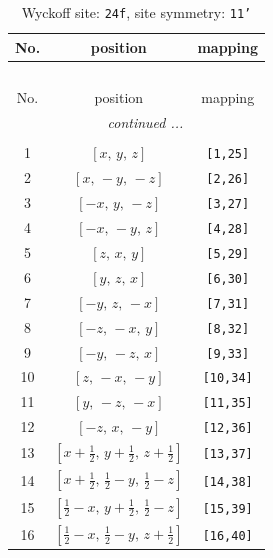 \documentclass[fleqn,8pt]{jsarticle}
\begin{document}
\begin{longtable}{ccc}
\caption{Wyckoff site: {\tt 24f}, site symmetry: {\tt 11'}}
 \\
 \hline \hline
No. & position & mapping \\ \hline \endfirsthead

\multicolumn{2}{l}{\tablename\ \thetable{}} \\
 \hline \hline
No. & position & mapping \\ \hline \endhead

 \hline \hline
\multicolumn{2}{r}{\footnotesize\it continued ...} \\ \endfoot

 \hline \hline
\multicolumn{2}{r}{} \\ \endlastfoot

1 & $\left[ x,\, y,\, z \right]$ & {\tt [1,25]} \\ \hline
2 & $\left[ x,\, - y,\, - z \right]$ & {\tt [2,26]} \\ \hline
3 & $\left[ - x,\, y,\, - z \right]$ & {\tt [3,27]} \\ \hline
4 & $\left[ - x,\, - y,\, z \right]$ & {\tt [4,28]} \\ \hline
5 & $\left[ z,\, x,\, y \right]$ & {\tt [5,29]} \\ \hline
6 & $\left[ y,\, z,\, x \right]$ & {\tt [6,30]} \\ \hline
7 & $\left[ - y,\, z,\, - x \right]$ & {\tt [7,31]} \\ \hline
8 & $\left[ - z,\, - x,\, y \right]$ & {\tt [8,32]} \\ \hline
9 & $\left[ - y,\, - z,\, x \right]$ & {\tt [9,33]} \\ \hline
10 & $\left[ z,\, - x,\, - y \right]$ & {\tt [10,34]} \\ \hline
11 & $\left[ y,\, - z,\, - x \right]$ & {\tt [11,35]} \\ \hline
12 & $\left[ - z,\, x,\, - y \right]$ & {\tt [12,36]} \\ \hline
13 & $\left[ x + \frac{1}{2},\, y + \frac{1}{2},\, z + \frac{1}{2} \right]$ & {\tt [13,37]} \\ \hline
14 & $\left[ x + \frac{1}{2},\, \frac{1}{2} - y,\, \frac{1}{2} - z \right]$ & {\tt [14,38]} \\ \hline
15 & $\left[ \frac{1}{2} - x,\, y + \frac{1}{2},\, \frac{1}{2} - z \right]$ & {\tt [15,39]} \\ \hline
16 & $\left[ \frac{1}{2} - x,\, \frac{1}{2} - y,\, z + \frac{1}{2} \right]$ & {\tt [16,40]} \\ \hline

\end{longtable}
\end{document}

